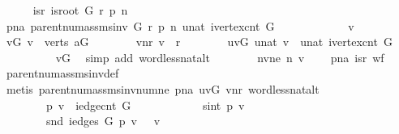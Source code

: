 \begin{isabellebody}
\ \ \ \ \isamarkupfalse%
\ isr{\isacharcolon}\ {\isachardoublequoteopen}is{\isacharunderscore}root\ G\ r\ p\ n{\isachardoublequoteclose}\isanewline
\ \ \ \ \isamarkupfalse%
\ pna{\isacharcolon}\ {\isachardoublequoteopen}parent{\isacharunderscore}num{\isacharunderscore}assms{\isacharunderscore}inv\ G\ r\ p\ n\ {\isacharparenleft}unat\ {\isacharparenleft}ivertex{\isacharunderscore}cnt\ G{\isacharparenright}{\isacharparenright}{\isachardoublequoteclose}\isanewline
\ \ \ \ \isacommand{{\isacharbraceleft}}\isamarkupfalse%
\isanewline
\ \ \ \ \ \ \isamarkupfalse%
\ v\ \isanewline
\ \ \ \ \ \ \isamarkupfalse%
\ vG{\isacharcolon}\ {\isachardoublequoteopen}v\ {\isasymin}\ verts\ {\isacharquery}aG{\isachardoublequoteclose}\isanewline
\ \ \ \ \ \ \isamarkupfalse%
\ vnr{\isacharcolon}\ {\isachardoublequoteopen}v\ {\isasymnoteq}\ r{\isachardoublequoteclose}\isanewline
\ \ \ \ \ \ \isamarkupfalse%
\ uvG{\isacharcolon}\ {\isachardoublequoteopen}unat\ v\ {\isacharless}\ unat\ {\isacharparenleft}ivertex{\isacharunderscore}cnt\ G{\isacharparenright}{\isachardoublequoteclose}\ \isanewline
\ \ \ \ \ \ \ \ \isamarkupfalse%
\ vG\ \isamarkupfalse%
\ {\isacharparenleft}simp\ add{\isacharcolon}\ word{\isacharunderscore}less{\isacharunderscore}nat{\isacharunderscore}alt{\isacharparenright}\isanewline
\ \ \ \ \ \ \isamarkupfalse%
\ nv{\isacharunderscore}ne{}{\isacharcolon}\ {\isachardoublequoteopen}n\ v\ {\isasymnoteq}\ {}{\isachardoublequoteclose}\ \isamarkupfalse%
\ pna\ isr\ wf\ \isamarkupfalse%
\ parent{\isacharunderscore}num{\isacharunderscore}assms{\isacharunderscore}inv{\isacharunderscore}def\ \ \isanewline
\ \ \ \ \ \ \ \ \isamarkupfalse%
\ {\isacharparenleft}metis\ parent{\isacharunderscore}num{\isacharunderscore}assms{\isacharunderscore}inv{\isacharunderscore}num{\isacharunderscore}ne{\isacharunderscore}{}\ pna\ uvG\ vnr\ word{\isacharunderscore}less{\isacharunderscore}nat{\isacharunderscore}alt{\isacharparenright}\isanewline
\ \ \ \ \ \ \isamarkupfalse%
\ \isamarkupfalse%
\ {\isacharasterisk}{\isacharcolon}\ {\isachardoublequoteopen}\isanewline
\ \ \ \ \ \ \ \ p\ v\ {\isacharless}\ iedge{\isacharunderscore}cnt\ G\ {\isasymand}\ \isanewline
\ \ \ \ \ \ \ \ {}\ {\isasymle}\ sint\ {\isacharparenleft}p\ v{\isacharparenright}\ {\isasymand}\isanewline
\ \ \ \ \ \ \ \ snd\ {\isacharparenleft}iedges\ G\ {\isacharparenleft}p\ v{\isacharparenright}{\isacharparenright}\ {\isacharequal}\ \ v\ {\isasymand}\ \isanewline

\end{isabellebody}
